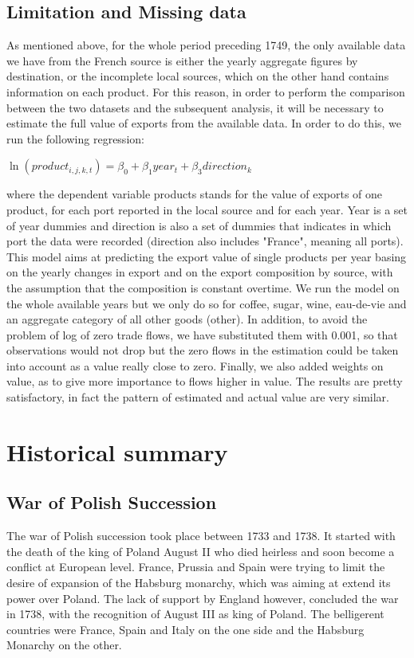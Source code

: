 \documentclass[12pt,a4paper,notitlepage,english]{article}
\begin{document}
\subsection{Limitation and Missing data}
As mentioned above, for the whole period preceding 1749, the only available data we have from the French source is either the yearly aggregate figures by destination, or the incomplete local sources, which on the other hand contains information on each product. For this reason, in order to perform the comparison between the two datasets and the subsequent analysis, it will be necessary to estimate the full value of exports from the available data. In order to do this, we run the following regression:
\begin{center}
$\ln(product_{i,j,k,t})=\beta_0 + \beta_1year_t+\beta_3direction_k$
\end{center}
where the dependent variable products stands for the value of exports of one product, for each port reported in the local source and for each year. Year is a set of year dummies and direction is also a set of dummies that indicates in which port the data were recorded (direction also includes "France", meaning all ports). This model aims at predicting the export value of single products per year basing on the yearly changes in export and on the export composition by source, with the assumption that the composition is constant overtime. We run the model on the whole available years but we only do so for coffee, sugar, wine, eau-de-vie and an aggregate category of all other goods (other). In addition, to avoid the problem of log of zero trade flows, we have substituted them with 0.001, so that observations would not drop but the zero flows in the estimation could be taken into account as a value really close to zero. Finally, we also added weights on value, as to give more importance to flows higher in value. The results are pretty satisfactory, in fact the pattern of estimated and actual value are very similar. 

\section{Historical summary}
\subsection{War of Polish Succession}
The war of Polish succession took place between 1733 and 1738. It started with the death of the king of Poland August II who died heirless and soon become a conflict at European level. France, Prussia and Spain were trying to limit the desire of expansion of the Habsburg monarchy, which was aiming at extend its power over Poland. The lack of support by England however, concluded the war in 1738, with the recognition of August III as king of Poland. The belligerent countries were France, Spain and Italy on the one side and the Habsburg Monarchy on the other. 
\end{document}
